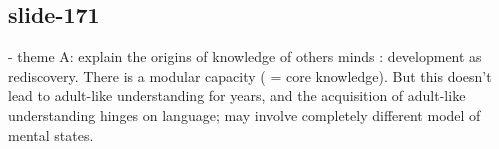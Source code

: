\documentclass[12pt,\papersize]{extarticle}
\begin{document}
 
\subsection{slide-171}
- theme A: explain the origins of knowledge of others minds : development as rediscovery. There is a modular capacity ( = core knowledge). But this doesn't lead to adult-like understanding for years, and the acquisition of adult-like understanding hinges on language; may involve completely different model of mental states.

 






\end{document}
